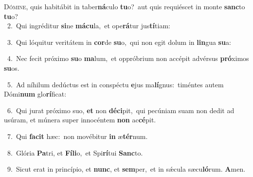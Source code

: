 \lettrine{\initial\textcolor{\initialcolor}{D}}{ómine,} quis habitábit in taber\-\textbf{ná}\-culo \textbf{tu}\-o?~\star aut quis requiéscet in monte \textbf{sanc}\-to \textbf{tu}\-o?\\
{\numbfont\textcolor{\numbcolor}{~2.}}~Qui ingréditur \textbf{si}\-ne \textbf{má}\-\textbf{cu}la,~\star et ope\-\textbf{rá}\-tur jus\-\textbf{tí}\-tiam:\par
{\numbfont\textcolor{\numbcolor}{~3.}}~Qui lóquitur veritátem in \textbf{cor}\-de \textbf{su}\-o,~\star qui non egit dolum in \textbf{lin}\-gua \textbf{su}\-a:\par
{\numbfont\textcolor{\numbcolor}{~4.}}~Nec fecit próximo \textbf{su}\-o \textbf{ma}\-lum,~\star et oppróbrium non accépit advérsus \textbf{pró}\-ximos \textbf{su}\-os.\par
{\numbfont\textcolor{\numbcolor}{~5.}}~Ad níhilum dedúctus est in conspéctu \textbf{e}\-jus ma\-\textbf{lí}\-gnus:~\star timéntes autem Dómi\textbf{num} glo\-\textbf{rí}\-ficat:\par
{\numbfont\textcolor{\numbcolor}{~6.}}~Qui jurat próximo suo, \textbf{et} non \textbf{dé}\-\textbf{ci}pit,~\star qui pecúniam suam non dedit ad usúram, et múnera super innocéntem \textbf{non} ac\-\textbf{cé}\-pit.\par
{\numbfont\textcolor{\numbcolor}{~7.}}~Qui \textbf{fa}\-\textbf{cit} hæc:~\star non movébitur \textbf{in} æ\-\textbf{tér}\-num.\par
{\numbfont\textcolor{\numbcolor}{~8.}}~Glória \textbf{Pa}\-tri, et \textbf{Fí}\-\textbf{li}o,~\star et Spi\-\textbf{rí}\-tui \textbf{Sanc}\-to.\par
{\numbfont\textcolor{\numbcolor}{~9.}}~Sicut erat in princípio, et \textbf{nunc}\-, et \textbf{sem}\-per,~\star et in sǽcula sæcu\-\textbf{ló}\-rum. \textbf{A}\-men.\par
